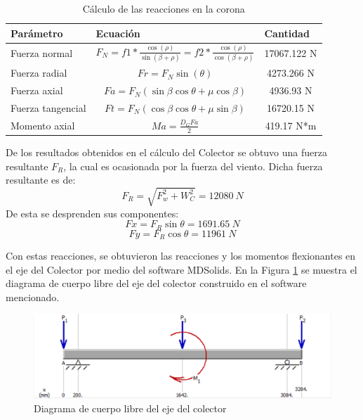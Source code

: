 \begin{table}[H]
	\centering
	\caption{Cálculo de las reacciones en la corona}
	\begin{tabular}{|l|c|c|}
		\hline
		\textbf{Parámetro} & \multicolumn{1}{l|}{\textbf{Ecuación}} & \multicolumn{1}{l|}{\textbf{Cantidad}} \\
		\hline \hline
		Fuerza normal & $ F_N=f1*\frac{\cos(\rho)}{\sin(\beta+\rho)}= f2*\frac{\cos(\rho)}{\cos(\beta+\rho)} $ & 17067.122 N \\
		\hline
		Fuerza radial & $ Fr=F_N \sin(\theta) $ & 4273.266 N \\
		\hline
		Fuerza axial & $ Fa=F_N (\sin\beta\cos\theta+\mu\cos\beta) $ & 4936.93 N \\
		\hline
		Fuerza tangencial & $ Ft=F_N (\cos\beta\cos\theta+\mu\sin\beta) $ & 16720.15 N \\
		\hline
		Momento axial & $ Ma=\frac{D_G Fa}{2} $ & 419.17 N*m \\
		\hline
	\end{tabular}%
	\label{tab:fcorona}%
\end{table}%

De los resultados obtenidos en el cálculo del Colector se obtuvo una fuerza resultante $ F_R $, la cual es ocasionada por la fuerza del viento. Dicha fuerza resultante es de:
\begin{equation}
	F_R=\sqrt{F_w^2+W_C^2}=12080\ N
\end{equation}
De esta se desprenden sus componentes:
\begin{equation}
	Fx=F_R \sin\theta =1691.65\ N
\end{equation}
\begin{equation}
	Fy=F_R \cos\theta=11961\ N
\end{equation}

Con estas reacciones, se obtuvieron las reacciones y los momentos flexionantes en el eje del Colector por medio del software MDSolids. En la Figura \ref{fig:colec1} se muestra el diagrama de cuerpo libre del eje del colector construido en el software mencionado.

\begin{figure}[H]
	\centering
	\includegraphics[width=\columnwidth]{imagenes/colectorDCL}
	\caption{Diagrama de cuerpo libre del eje del colector}
	\label{fig:colec1}
\end{figure}

